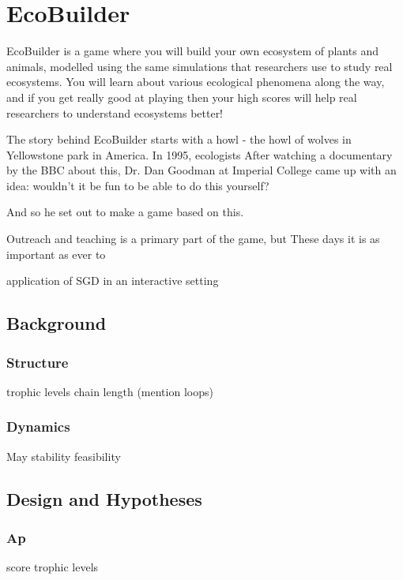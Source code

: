 \chapter{EcoBuilder}
EcoBuilder is a game where you will build your own ecosystem of plants and animals, modelled using the same simulations that researchers use to study real ecosystems. You will learn about various ecological phenomena along the way, and if you get really good at playing then your high scores will help real researchers to understand ecosystems better!

The story behind EcoBuilder starts with a howl - the howl of wolves in Yellowstone park in America. In 1995, ecologists
After watching a documentary by the BBC about this, Dr. Dan Goodman at Imperial College came up with an idea: wouldn't it be fun to be able to do this yourself?

And so he set out to make a game based on this.

Outreach and teaching is a primary part of the game, but 
These days it is as important as ever to 

application of SGD in an interactive setting

\section{Background}

\subsection{Structure}
trophic levels
chain length
(mention loops)
\subsection{Dynamics}
May stability
feasibility

\section{Design and Hypotheses}
\subsection{Ap}
score
trophic levels

